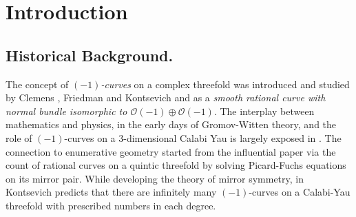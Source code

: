 \documentclass[12pt]{article}
\numberwithin{equation}{section}
\numberwithin{subeq}{equation}
\def\calO{\mathcal{O}}
\begin{document}
\begin{abstract}
In this paper we study  $(i)$-curves with $i\in \{-1, 0, 1\}$ in the blown up projective space $\mathbb{P}^r$ in general points.
The notion of $(-1)$-curves was analyzed in the early days of mirror symmetry by Kontsevich
with the motivation of counting curves on a Calabi-Yau threefold.
In dimension two, Nagata studied planar $(-1)$-curves
in order to construct counterexample to Hilbert's 14th problem.

We introduce the notion of classes of $(0)$- and $(1)$-curves
in $\mathbb{P}^r$ with $s$ points blown up
and we prove that their number is finite if and only if the space is a Mori Dream Space.
We further introduce a bilinear form on a space of curves,
and a unique symmetric Weyl-invariant class, $F$,
(that we will refer to as the \emph{anticanonical curve class}).
For Mori Dream Spaces we prove that $(-1)$-curves can be defined arithmetically
by the linear and quadratic invariants determined by the bilinear form.
Moreover, $(0)$- and $(1)$-Weyl lines give the extremal rays
for the cone of movable curves in $\mathbb{P}^r$ with $r+3$ points blown up.
As an application, we use the technique of movable curves to reprove that
if $F^2\leq 0$ then $Y$ is not a Mori Dream Space
and we propose to apply this technique to other spaces.
\end{abstract}
\tableofcontents


\section{Introduction}
\subsection{Historical Background.}
The concept of \emph{ $(-1)$-curves} on a complex threefold
was introduced and studied by
Clemens \cite{C},
Friedman \cite[Section 8]{F}
and Kontsevich \cite[Section 1.4]{maxim1} and \cite[Section 2.3]{maxim2}
as a \emph{smooth rational curve with normal bundle isomorphic to $\calO(-1) \oplus \calO(-1)$}.
The interplay between mathematics and physics,
in the early days of Gromov-Witten theory,
and the role of $(-1)$-curves on a $3$-dimensional Calabi Yau 
is largely exposed in \cite{CK}.
The connection to enumerative geometry started from the influential paper \cite{Cd}
via the count of rational curves on a quintic threefold
by solving Picard-Fuchs equations on its mirror pair.
While developing the theory of mirror symmetry,
in \cite{maxim1} Kontsevich predicts that there are infinitely many $(-1)$-curves
on a Calabi-Yau threefold with prescribed numbers in each degree.
\end{document}
